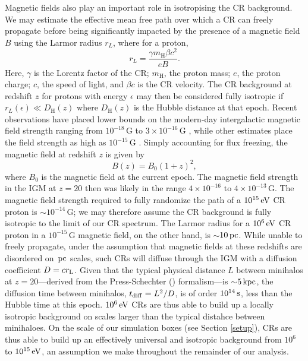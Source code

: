 \documentclass[usenatbib]{mn2e}
\newcommand{\s}{\,{\rm s}}
\newcommand{\pc}{\,{\rm pc}}
\newcommand{\kpc}{\,{\rm kpc}}
\newcommand{\ev}{\,{\rm eV}}
\newcommand{\mh}{m_{\mathrm{H}}}
\newcommand{\Dhubble}{D_{\mathrm{H}}}
\begin{document}
Magnetic fields also play an important role in isotropising the CR background.  
We may estimate the effective mean free path over which a CR can freely propagate before being significantly impacted by the presence of a magnetic field $B$ using the Larmor radius $r_L$, where for a proton, 
\begin{equation}
r_L = \frac{\gamma \mh \beta c^2}{eB}.
\end{equation}
Here, $\gamma$ is the Lorentz factor of the CR; $\mh$, the proton mass; $e$, the proton charge; $c$, the speed of light, and $\beta c$ is the CR velocity. 
The CR background at redshift $z$ for protons with energy $\epsilon$ may then be considered fully isotropic if $r_L(\epsilon) \ll \Dhubble(z)$ where $\Dhubble(z)$ is the Hubble distance at that epoch. 
Recent observations have placed lower bounds on the modern-day intergalactic magnetic field strength ranging from $10^{-18}\,$G \citep{Dermeretal2011} to $3\times10^{-16}\,$G \citep{NeronovVovk2010}, while other estimates place the field strength as high as $10^{-15}\,$G \citep{AndoKusenko2010}.  
Simply accounting for flux freezing, the magnetic field at redshift $z$ is given by
\begin{equation}
B(z) = B_0 (1+z)^2,
\end{equation}
where $B_0$ is the magnetic field at the current epoch. 
The magnetic field strength in the IGM at $z=20$ then was likely in the range $4\times10^{-16}$ to $4\times10^{-13}\,$G.  
The magnetic field strength required to fully randomize the path of a $10^{15}\ev$ CR proton is $\sim$$10^{-14}\,$G; we may therefore assume the CR background is fully isotropic to the limit of our CR spectrum.  
The Larmor radius for a $10^6\ev$ CR proton in a $10^{-15}\,$G magnetic field, on the other hand, is $\sim$$10\pc$.  
While unable to freely propagate, under the assumption that magnetic fields at these redshifts are disordered on $\pc$ scales, such CRs will diffuse through the IGM with a diffusion coefficient $D = c r_{\rm L}$.  
Given that the typical physical distance $L$ between minihalos at $z=20$---derived from the Press-Schechter (\citeyear{PressSchechter1974}) formalism---is $\sim$$5\kpc$, the diffusion time between minihalos, $t_{\rm diff} = L^2/D$, is of order $10^{14}\s$, less than the Hubble time at this epoch.
$10^6\ev$ CRs are thus able to build up a locally isotropic background on scales larger than the typical distahce between minihaloes.
On the scale of our simulation boxes (see Section \ref{setup}), CRs are thus able to build up an effectively universal and isotropic background from $10^6$ to $10^{15}\ev$, an assumption we make throughout the remainder of our analysis.
\end{document}
